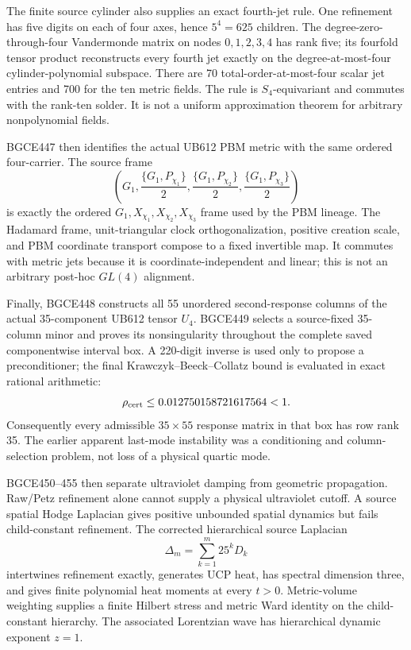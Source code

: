 \documentclass[11pt]{article}
\theoremstyle{definition}
\theoremstyle{remark}
\begin{document}
The finite source cylinder also supplies an exact fourth-jet rule. One refinement has five digits on each of four axes, hence $5^4=625$ children. The degree-zero-through-four Vandermonde matrix on nodes $0,1,2,3,4$ has rank five; its fourfold tensor product reconstructs every fourth jet exactly on the degree-at-most-four cylinder-polynomial subspace. There are 70 total-order-at-most-four scalar jet entries and 700 for the ten metric fields. The rule is $S_4$-equivariant and commutes with the rank-ten solder. It is not a uniform approximation theorem for arbitrary nonpolynomial fields.

BGCE447 then identifies the actual UB612 PBM metric with the same ordered four-carrier. The source frame
\begin{equation}
 \left(G_1,\frac{\{G_1,P_{\chi_1}\}}2,
 \frac{\{G_1,P_{\chi_2}\}}2,
 \frac{\{G_1,P_{\chi_3}\}}2\right)
\end{equation}
is exactly the ordered $G_1,X_{\chi_1},X_{\chi_2},X_{\chi_3}$ frame used by the PBM lineage. The Hadamard frame, unit-triangular clock orthogonalization, positive creation scale, and PBM coordinate transport compose to a fixed invertible map. It commutes with metric jets because it is coordinate-independent and linear; this is not an arbitrary post-hoc $GL(4)$ alignment.

Finally, BGCE448 constructs all 55 unordered second-response columns of the actual 35-component UB612 tensor $U_4$. BGCE449 selects a source-fixed 35-column minor and proves its nonsingularity throughout the complete saved componentwise interval box. A 220-digit inverse is used only to propose a preconditioner; the final Krawczyk--Beeck--Collatz bound is evaluated in exact rational arithmetic:
\begin{equation}
 \rho_{\rm cert}\le 0.012750158721617564<1.
\end{equation}
Consequently every admissible $35\times55$ response matrix in that box has row rank 35. The earlier apparent last-mode instability was a conditioning and column-selection problem, not loss of a physical quartic mode.

BGCE450--455 then separate ultraviolet damping from geometric propagation. Raw/Petz refinement alone cannot supply a physical ultraviolet cutoff. A source spatial Hodge Laplacian gives positive unbounded spatial dynamics but fails child-constant refinement. The corrected hierarchical source Laplacian
\begin{equation}
 \Delta_m=\sum_{k=1}^{m}25^kD_k
\end{equation}
intertwines refinement exactly, generates UCP heat, has spectral dimension three, and gives finite polynomial heat moments at every $t>0$. Metric-volume weighting supplies a finite Hilbert stress and metric Ward identity on the child-constant hierarchy. The associated Lorentzian wave has hierarchical dynamic exponent $z=1$.
\end{document}
